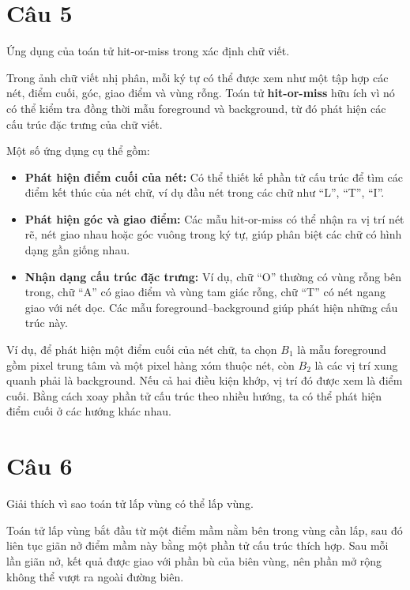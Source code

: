 \section*{Câu 5}
Ứng dụng của toán tử hit-or-miss trong xác định chữ viết.

Trong ảnh chữ viết nhị phân, mỗi ký tự có thể được xem như một tập hợp các nét, điểm cuối, góc, giao điểm và vùng rỗng. Toán tử \textbf{hit-or-miss} hữu ích vì nó có thể kiểm tra đồng thời mẫu foreground và background, từ đó phát hiện các cấu trúc đặc trưng của chữ viết.

Một số ứng dụng cụ thể gồm:

\begin{itemize}
    \item \textbf{Phát hiện điểm cuối của nét:} Có thể thiết kế phần tử cấu trúc để tìm các điểm kết thúc của nét chữ, ví dụ đầu nét trong các chữ như ``L'', ``T'', ``I''.

    \item \textbf{Phát hiện góc và giao điểm:} Các mẫu hit-or-miss có thể nhận ra vị trí nét rẽ, nét giao nhau hoặc góc vuông trong ký tự, giúp phân biệt các chữ có hình dạng gần giống nhau.

    \item \textbf{Nhận dạng cấu trúc đặc trưng:} Ví dụ, chữ ``O'' thường có vùng rỗng bên trong, chữ ``A'' có giao điểm và vùng tam giác rỗng, chữ ``T'' có nét ngang giao với nét dọc. Các mẫu foreground--background giúp phát hiện những cấu trúc này.
\end{itemize}

Ví dụ, để phát hiện một điểm cuối của nét chữ, ta chọn $B_1$ là mẫu foreground gồm pixel trung tâm và một pixel hàng xóm thuộc nét, còn $B_2$ là các vị trí xung quanh phải là background. Nếu cả hai điều kiện khớp, vị trí đó được xem là điểm cuối. Bằng cách xoay phần tử cấu trúc theo nhiều hướng, ta có thể phát hiện điểm cuối ở các hướng khác nhau.

\section*{Câu 6}
Giải thích vì sao toán tử lấp vùng có thể lấp vùng.

Toán tử lấp vùng bắt đầu từ một điểm mầm nằm bên trong vùng cần lấp, sau đó liên tục giãn nở điểm mầm này bằng một phần tử cấu trúc thích hợp. Sau mỗi lần giãn nở, kết quả được giao với phần bù của biên vùng, nên phần mở rộng không thể vượt ra ngoài đường biên.

